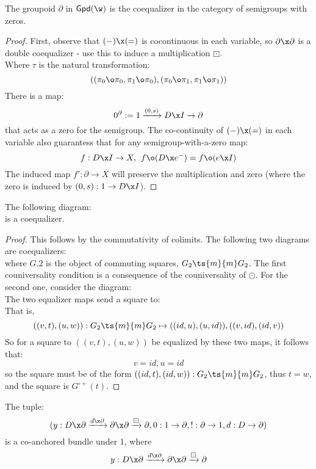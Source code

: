 \begin{proposition}%
	\label{prop:coeq-of-semigroup-w-z}
	The groupoid $\partial$ in $\mathsf{Gpd}(\w)$ is the coequalizer in the category of semigroups with zeros.
\end{proposition}
\begin{proof}
	First, observe that $(-)\x (=)$ is cocontinuous in each variable, so $\partial \x \partial$ is a double coequalizer - use this to induce a multiplication $\boxdot$.
	\[\]
	Where $\tau$ is the natural transformation: \[((\pi_0\o \pi_0, \pi_1 \o \pi_0),(\pi_0\o\pi_1, \pi_1 \o\pi_1))\]
	There is a map:
	\[
		0^\partial:= 1 \xrightarrow[]{(0,s)} D \x I \to \partial	
	\]
	that acts as a zero for the semigroup. 
	The co-continuity of $(-)\x (=)$ in each variable also guarantess that for any semigroup-with-a-zero map:
	\[
		f: D \x I \to X, \hspace{0.15cm}f \o (D \x e^-) = f \o (e \x I)
	\]
	The induced map $f': \partial \to X$ will preserve the multiplication and zero (where the zero is induced by $(0, s): 1 \to D \x I$).
\end{proof}
\begin{corollary}%
	\label{cor:boxdot-coeq}
	The following diagram:
	\[
		
	\]
	is a coequalizer.
\end{corollary}
\begin{proof}
	This follows by the commutativity of colimits. The following two diagrams are coequalizers:
	\[\]
	where $G.2$ is the object of commuting squares, $G_2 \ts{m}{m} G_2$.
	The first couniversality condition is a consequence of the couniversality of $\odot$.
	For the second one, consider the diagram:
	\[\]
	The two equalizer maps send a square to:
	\[\]
	That is,
	\[
		((v,t), (u,w)): G_2 \ts{m}{m} G_2 \mapsto ((id,u),(u,id)), ((v,id),(id,v))
	\]
	So for a square to $((v,t), (u,w))$ be equalized by these two maps, it follows that:
	\[
		v = id, u = id
	\]
	so the square must be of the form $((id,t),(id,w)):G_2 \ts{m}{m} G_2$, thus $t = w$, and the square is $G^{\square +}(t)$.
\end{proof}

\begin{lemma}%
	\label{lem:co-anchored-bundle-gpd}
	The tuple:
	\[
		(y: D \x \partial \xrightarrow[]{d \x \partial} \partial \x \partial \xrightarrow[]{\boxdot}\partial, 0: 1 \to \partial, !:\partial \to 1, d:D \to \partial)
	\]
	is a co-anchored bundle under $1$, where
	\[
		y: D \x \partial \xrightarrow[]{d \x \partial} \partial \x \partial \xrightarrow[]{\boxdot} \partial
	\]
\end{lemma}


